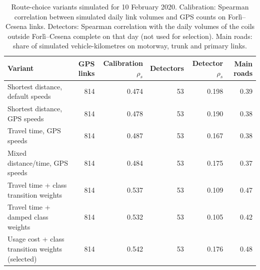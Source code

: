 \begin{table}[htbp]\centering
\caption{Route-choice variants simulated for 10 February 2020. Calibration: Spearman correlation between simulated daily link volumes and GPS counts on Forl\`i--Cesena links. Detectors: Spearman correlation with the daily volumes of the coils outside Forl\`i--Cesena complete on that day (not used for selection). Main roads: share of simulated vehicle-kilometres on motorway, trunk and primary links.}
\label{tab:routing}
\begin{tabular}{@{}lrrrrr@{}}\toprule
Variant & GPS links & Calibration $\rho_s$ & Detectors & Detector $\rho_s$ & Main roads \\\midrule
Shortest distance, default speeds & 814 & 0.474 & 53 & 0.198 & 0.39 \\
Shortest distance, GPS speeds & 814 & 0.478 & 53 & 0.190 & 0.38 \\
Travel time, GPS speeds & 814 & 0.487 & 53 & 0.167 & 0.38 \\
Mixed distance/time, GPS speeds & 814 & 0.484 & 53 & 0.175 & 0.37 \\
Travel time + class transition weights & 814 & 0.537 & 53 & 0.109 & 0.47 \\
Travel time + damped class weights & 814 & 0.532 & 53 & 0.105 & 0.42 \\
Usage cost + class transition weights (selected) & 814 & 0.542 & 53 & 0.176 & 0.48 \\
\bottomrule\end{tabular}\end{table}
